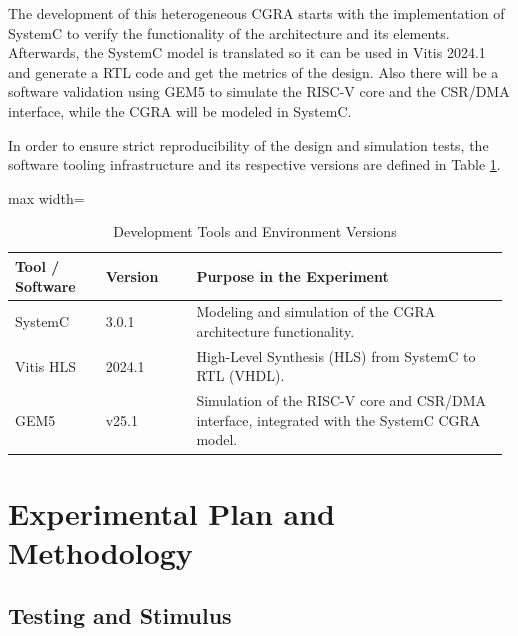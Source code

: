 \documentclass[conference]{IEEEtran}
\begin{document}
The development of this heterogeneous CGRA starts with the implementation of SystemC to verify the functionality of the architecture and its elements. 
Afterwards, the SystemC model is translated so it can be used in Vitis 2024.1 and generate a RTL code and get the metrics of the design.
Also there will be a software validation using GEM5 to simulate the RISC-V core and the CSR/DMA interface, while the CGRA will be modeled in SystemC.

In order to ensure strict reproducibility of the design and simulation tests, the software tooling infrastructure and its respective versions are defined in Table \ref{tab:herramientas}.

\begin{table}[htbp]
\caption{Development Tools and Environment Versions}
\label{tab:herramientas}
\centering
\scriptsize
\begin{adjustbox}{max width=\columnwidth}
\begin{tabular}{@{}p{0.18\linewidth}p{0.18\linewidth}p{0.62\linewidth}@{}}
\toprule
\textbf{Tool / Software} & \textbf{Version} & \textbf{Purpose in the Experiment} \\
\midrule
SystemC & 3.0.1 & Modeling and simulation of the CGRA architecture functionality. \\
Vitis HLS & 2024.1 & High-Level Synthesis (HLS) from SystemC to RTL (VHDL). \\
GEM5 & v25.1 & Simulation of the RISC-V core and CSR/DMA interface, integrated with the SystemC CGRA model. \\
\bottomrule
\end{tabular}
\end{adjustbox}
\end{table}




\section{Experimental Plan and Methodology}%
\label{sec:experimento}


\subsection{Testing and Stimulus}
\end{document}

